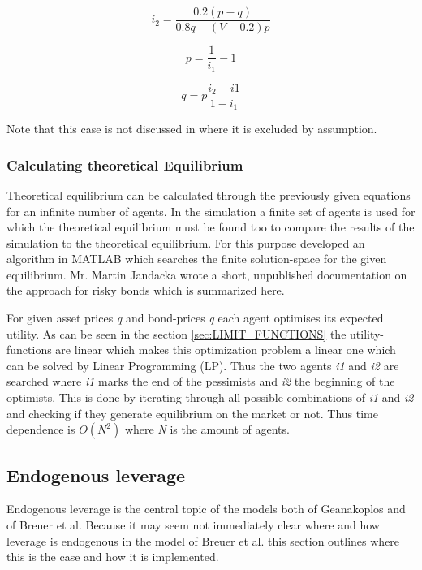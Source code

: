 \documentclass[../Bachelorarbeit.tex]{subfiles}
\begin{document}
\begin{equation}
i_{2} = \frac{0.2(p - q)}{0.8q - (V - 0.2)p}
\end{equation}

\begin{equation}
p = \frac{1}{i_{1}} - 1
\end{equation}

\begin{equation}
q = p \frac{i_{2} - i{1}}{1 - i_{1}}
\end{equation}

Note that this case is not discussed in \cite{Geanakoplos2009} where it is excluded by assumption.

\subsubsection{Calculating theoretical Equilibrium}
Theoretical equilibrium can be calculated through the previously given equations for an infinite number of agents. In the simulation a finite set of agents is used for which the theoretical equilibrium must be found too to compare the results of the simulation to the theoretical equilibrium. For this purpose \cite{Breuer2015} developed an algorithm in MATLAB which searches the finite solution-space for the given equilibrium. Mr. Martin Jandacka wrote a short, unpublished documentation on the approach for risky bonds which is summarized here.

\medskip

For given asset prices \textit{q} and bond-prices \textit{q} each agent optimises its expected utility. As can be seen in the section \ref{sec:LIMIT_FUNCTIONS} the utility-functions are linear which makes this optimization problem a linear one which can be solved by Linear Programming (LP). Thus the two agents \textit{i1} and \textit{i2} are searched where \textit{i1} marks the end of the pessimists and \textit{i2} the beginning of the optimists. This is done by iterating through all possible combinations of \textit{i1} and \textit{i2} and checking if they generate equilibrium on the market or not. Thus time dependence is $O(N^2)$ where \textit{N} is the amount of agents. 

\subsection{Endogenous leverage}
Endogenous leverage is the central topic of the models both of Geanakoplos and of Breuer et al. Because it may seem not immediately clear where and how leverage is endogenous in the model of Breuer et al. this section outlines where this is the case and how it is implemented. 
\end{document}
